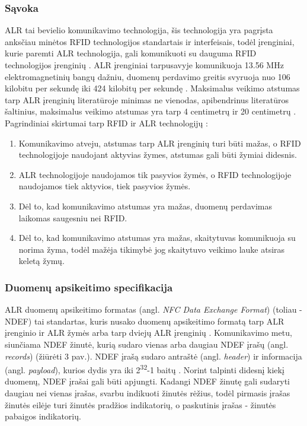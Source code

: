 \subsubsection{Sąvoka}
ALR tai bevielio komunikavimo technologija, šis technologija yra pagrįsta anksčiau minėtos RFID technologijos standartais ir interfeisais, todėl įrenginiai, kurie paremti ALR technologija, gali komunikuoti su dauguma RFID technologijos įrenginių \cite{Motlagh2012}. ALR įrenginiai tarpusavyje komunikuoja 13.56 MHz elektromagnetinių bangų dažniu, duomenų perdavimo greitis svyruoja nuo 106 kilobitu per sekundę iki 424 kilobitų per sekundę \cite{whitepapaer}. Maksimalus veikimo atstumas tarp ALR įrenginių literatūroje minimas ne vienodas, apibendrinus literatūros šaltinius, maksimalus veikimo atstumas yra tarp 4 centimetrų ir 20 centimetrų \cite{whitepapaer} \cite{Motlagh2012} \cite{Leora1980}. Pagrindiniai skirtumai tarp RFID ir ALR technologijų \cite{Leora1980}:
\begin{enumerate}
    \item Komunikavimo atveju, atstumas tarp ALR įrenginių turi būti mažas, o RFID technologijoje naudojant aktyvias žymes, atstumas gali būti žymiai didesnis.
    \item ALR technologijoje naudojamos tik pasyvios žymės, o RFID technologijoje naudojamos tiek aktyvios, tiek pasyvios žymės.
    \item Dėl to, kad komunikavimo atstumas yra mažas, duomenų perdavimas laikomas saugesniu nei RFID.
    \item Dėl to, kad komunikavimo atstumas yra mažas, skaitytuvas komunikuoja su norima žyma, todėl mažėja tikimybė jog skaitytuvo veikimo lauke atsiras keletą žymų.
\end{enumerate}
 

\subsubsection{Duomenų apsikeitimo specifikacija}
ALR duomenų apsikeitimo formatas (angl. \textit{NFC Data Exchange Format}) (toliau - NDEF) tai standartas, kuris nusako duomenų apsikeitimo formatą tarp ALR įrenginio ir ALR žymės arba tarp dviejų ALR įrenginių \cite{Leora1980}. Komunikavimo metu, siunčiama NDEF žinutė, kurią sudaro vienas arba daugiau NDEF įrašų (angl. \textit{records}) (žiūrėti 3 pav.). NDEF įrašą sudaro antraštė (angl. \textit{header}) ir informacija (angl. \textit{payload}), kurios dydis yra iki 2\textsuperscript{32}-1 baitų \cite{NFCForum2006}. Norint talpinti didesnį kiekį duomenų, NDEF įrašai gali būti apjungti. Kadangi NDEF žinutę gali sudaryti daugiau nei vienas įrašas, svarbu indikuoti žinutės rėžius, todėl pirmasis įrašas žinutės eilėje turi žinutės pradžios indikatorių, o paskutinis įrašas - žinutės pabaigos indikatorių.

